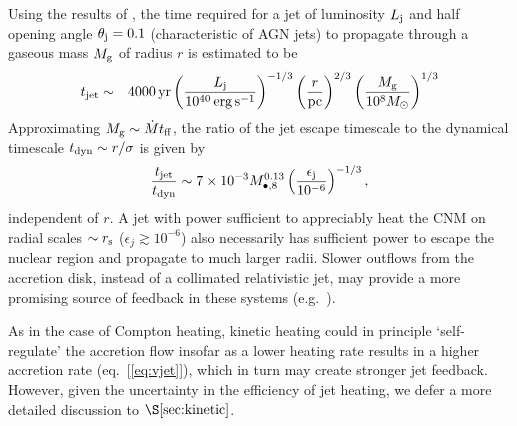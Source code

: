 \documentclass[usenatbib,fleqn]{mn2e}
\begin{document}
Using the results of \citet{Bromberg+11}, the time required for a jet of luminosity $L_{\rm
  j}$ and half opening angle $\theta_{\rm j} = 0.1$ (characteristic of
AGN jets) to propagate through a gaseous mass $M_{\rm g}$ of radius $r$ is estimated to be
\begin{eqnarray}
t_{\rm jet} &\sim& 4000\,{\rm yr}\left(\frac{{L}_{\rm j}}{10^{40}\,\rm erg\,s^{-1}}\right)^{-1/3}\left(\frac{r}{\rm pc}\right)^{2/3}\left(\frac{M_{\rm g}}{10^{8}M_{\odot}}\right)^{1/3} 
\end{eqnarray}
Approximating $M_{\rm g} \sim \dot{M}t_{\rm ff}$, the ratio of the jet escape timescale to the dynamical timescale $t_{\rm dyn} \sim r/\sigma$ is given by
\begin{equation}
\frac{t_{\rm jet}}{t_{\rm dyn}} \sim 7\times 10^{-3}M_{\bullet,8}^{0.13}\left(\frac{\epsilon_{\rm j}}{10^{-6}}\right)^{-1/3},
\end{equation}
independent of $r$.  A jet with power sufficient to appreciably heat
the CNM on radial scales $\sim r_{\rm s}$ ($\epsilon_{j} \gtrsim
10^{-6}$) also necessarily has sufficient power to escape the nuclear
region and propagate to much larger radii.  Slower outflows from the
accretion disk, instead of a collimated relativistic jet, may provide
a more promising source of feedback in these systems
(e.g.~\citealt{Li+13}).

As in the case of Compton heating, kinetic heating could in principle
`self-regulate' the accretion flow insofar as a lower heating rate
results in a higher accretion rate (eq.~[\ref{eq:vjet}]), which in
turn may create stronger jet feedback.  However, given the uncertainty
in the efficiency of jet heating, we defer a more detailed discussion
to $\S\ref{sec:kinetic}$.
\end{document}
